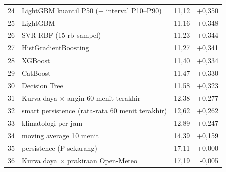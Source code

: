 {\begin{minipage}[t]{0.49\linewidth}
\begin{tabular}{@{}r p{4.1cm} r r@{}}
24 & LightGBM kuantil P50 (+ interval P10–P90) & 11,12 & +0,350 \\
25 & LightGBM & 11,16 & +0,348 \\
26 & SVR RBF (15 rb sampel) & 11,23 & +0,344 \\
27 & HistGradientBoosting & 11,27 & +0,341 \\
28 & XGBoost & 11,40 & +0,334 \\
29 & CatBoost & 11,47 & +0,330 \\
30 & Decision Tree & 11,58 & +0,323 \\
31 & Kurva daya $\times$ angin 60 menit terakhir & 12,38 & +0,277 \\
32 & smart persistence (rata-rata 60 menit terakhir) & 12,62 & +0,262 \\
33 & klimatologi per jam & 12,89 & +0,247 \\
34 & moving average 10 menit & 14,39 & +0,159 \\
35 & persistence (P sekarang) & 17,11 & +0,000 \\
36 & Kurva daya $\times$ prakiraan Open-Meteo & 17,19 & -0,005 \\
\bottomrule
\end{tabular}\end{minipage}}
